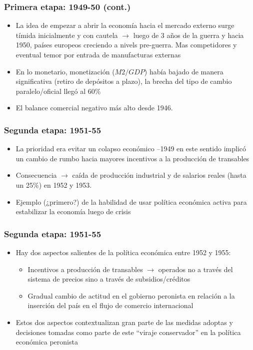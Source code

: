 \documentclass[14pt,aspectratio=169]{beamer}
\begin{document}
               
                  \begin{frame}\frametitle{Primera etapa: 1949-50 (cont.)}
  \begin{itemize}\itemsep 10pt
      \item La idea de empezar a abrir la economía hacia el mercado
        externo surge tímida inicialmente y con cautela
        $\longrightarrow$ luego de 3 años de la guerra y hacia 1950,
        países europeos creciendo a nivels pre-guerra. Mas
        competidores y eventual temor por entrada de manufacturas
        externas
        \item En lo monetario, monetización ($M2/GDP$) había bajado de
          manera significativa (retiro de depósitos a plazo), la
          brecha del tipo de cambio paralelo/oficial llegó al 60\%
          \item El balance comercial negativo más alto desde 1946. 
                 \end{itemize}
               \end{frame}


 \begin{frame}\frametitle{Segunda etapa: 1951-55}
  \begin{itemize}\itemsep 10pt
      \item La prioridad era evitar un colapso económico --1949 en
        este sentido implicó un cambio de rumbo hacia mayores
        incentivos a la producción de transables
        \item Consecuencia $\longrightarrow$ caída de producción
          industrial y de salarios reales (hasta un 25\%) en 1952 y
          1953.
          \item Ejemplo (¿primero?) de la habilidad de usar política
            económica activa para estabilizar la economía luego de crisis
                 \end{itemize}
               \end{frame}



               \begin{frame}\frametitle{Segunda etapa: 1951-55}
  \begin{itemize}\itemsep 10pt
      \item Hay dos aspectos salientes de la política económica entre
        1952 y 1955:
        \begin{itemize}\itemsep 5pt \medskip
        \item Incentivos a producción de transables $\longrightarrow$
          operados no a través del sistema de precios sino a través de
          subsidios/créditos
          \item Gradual cambio de actitud en el gobierno peronista en
            relación a la inserción del país en el flujo de comercio internacional
          \end{itemize}
          \item Estos dos aspectos contextualizan gran parte de las
            medidas adoptas y decisiones tomadas como parte de este
            ``viraje conservador'' en la política económica peronista
                 \end{itemize}
               \end{frame}
               
\end{document}
